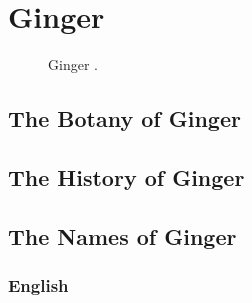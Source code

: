 \section{Ginger}
\label{sec:ginger}



\begin{figure}[!ht]
	\vspace{-4ex}
	\centering
	\hfill
	\caption{Ginger \textit{}.}
	\label{fig:ginger_imgs}
\end{figure}

\subsection{The Botany of Ginger}

\subsection{The History of Ginger}

\subsection{The Names of Ginger}

\subsubsection{English}

